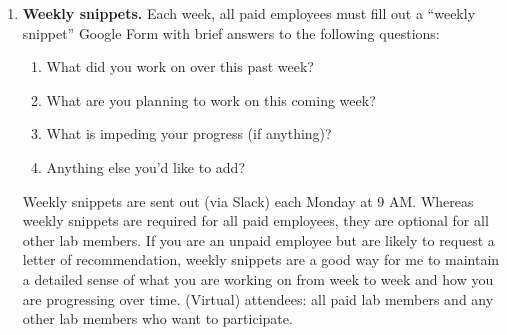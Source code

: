 \documentclass{tufte-book} %
\begin{document}
\begin{enumerate}
    \item \textbf{Weekly snippets.} Each week, all
      paid employees must fill out a ``weekly snippet'' Google Form 
      with brief answers to the following questions:
      \begin{enumerate}
      \item What did you work on over this past week?
      \item What are you planning to work on this coming week?
      \item What is impeding your progress (if anything)?
      \item Anything else you'd like to add?
      \end{enumerate}
      Weekly snippets are sent out (via Slack) each Monday at 9 AM.
      Whereas weekly snippets are required for all paid employees,
      they are optional for all other lab members.  If you are an
      unpaid employee but are likely to request a letter of
      recommendation, weekly snippets are a good way for me to
      maintain a detailed sense of what you are working on from week
      to week and how you are progressing over time.  (Virtual)
      attendees: all paid lab members and any other lab members who
      want to participate.
\end{enumerate}

{}
\end{document}
